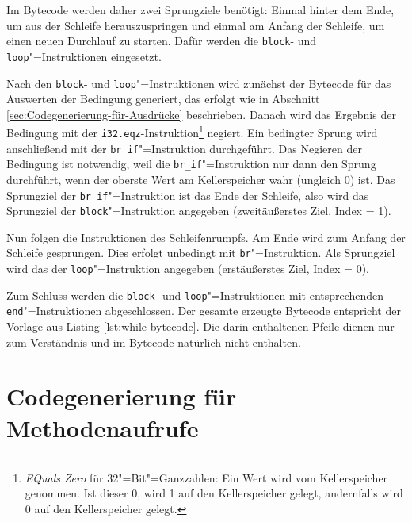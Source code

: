 Im Bytecode werden daher zwei Sprungziele benötigt: Einmal hinter dem Ende, um aus der Schleife herauszuspringen und einmal am Anfang der Schleife, um einen neuen Durchlauf zu starten. Dafür werden die \lstinline{block}- und \lstinline{loop}"=Instruktionen eingesetzt.

Nach den \lstinline{block}- und \lstinline{loop}"=Instruktionen wird zunächst der Bytecode für das Auswerten der Bedingung generiert, das erfolgt wie in Abschnitt \ref{sec:Codegenerierung-für-Ausdrücke} beschrieben. Danach wird das Ergebnis der Bedingung mit der \lstinline{i32.eqz}-Instruktion\footnote{\emph{EQuals Zero} für 32"=Bit"=Ganzzahlen: Ein Wert wird vom Kellerspeicher genommen. Ist dieser 0, wird 1 auf den Kellerspeicher gelegt, andernfalls wird 0 auf den Kellerspeicher gelegt.} negiert. Ein bedingter Sprung wird anschließend mit der \lstinline{br_if}"=Instruktion durchgeführt. Das Negieren der Bedingung ist notwendig, weil die \lstinline{br_if}"=Instruktion nur dann den Sprung durchführt, wenn der oberste Wert am Kellerspeicher wahr (ungleich 0) ist. Das Sprungziel der \lstinline{br_if}"=Instruktion ist das Ende der Schleife, also wird das Sprungziel der \lstinline{block}"=Instruktion angegeben (zweitäußerstes Ziel, Index = 1).

Nun folgen die Instruktionen des Schleifenrumpfs. Am Ende wird zum Anfang der Schleife gesprungen. Dies erfolgt unbedingt mit \lstinline{br}"=Instruktion. Als Sprungziel wird das der \lstinline{loop}"=Instruktion angegeben (erstäußerstes Ziel, Index = 0).

Zum Schluss werden die \lstinline{block}- und \lstinline{loop}"=Instruktionen mit entsprechenden \lstinline{end}"=Instruktionen abgeschlossen. Der gesamte erzeugte Bytecode entspricht der Vorlage aus Listing \ref{lst:while-bytecode}. Die darin enthaltenen Pfeile dienen nur zum Verständnis und im Bytecode natürlich nicht enthalten.



\section{Codegenerierung für Methodenaufrufe}
\label{sec:Codegenerierung-für-Methodenaufrufe}

